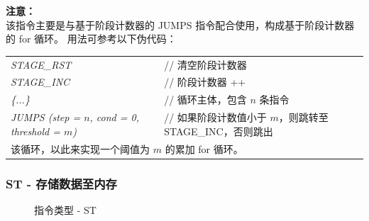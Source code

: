 \documentclass[main\_\_CN.tex]{subfiles}
\begin{document}
\textbf{注意：} \\
    该指令主要是与基于阶段计数器的 JUMPS 指令配合使用，构成基于阶段计数器的 for 循环。
    用法可参考以下伪代码：

    \begin{table}[!ht ]
    \centering
    \begin{tabular}{ l l }
    \textit{STAGE\_RST}  & // 清空阶段计数器   \\
    \textit{STAGE\_INC} & // 阶段计数器 ++  \\
    \textit{\{...\}} &  // 循环主体，包含 \begin{math}n\end{math} 条指令   \\
    \textit{JUMPS (step = \begin{math}n\end{math}, cond = 0, threshold = \begin{math}m\end{math})}  & // 如果阶段计数值小于 \begin{math}m\end{math}，则跳转至 STAGE\_INC，否则跳出 \\
    \multicolumn{2}{l}{该循环，以此来实现一个阈值为 \begin{math}m\end{math} 的累加 for 循环。}
    \end{tabular}
\end{table}

\subsubsection {ST - 存储数据至内存}\label{st instruction}


%
%
%
%
%
%
%
%
%
%
%
%
\begin{figure}[!ht]
    \centering
    \caption{指令类型 - ST}
    \label{figure:ST}
\end{figure}
\end{document}
